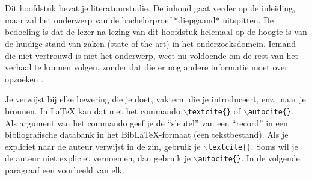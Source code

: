 \chapter{}%
\label{ch:stand-van-zaken}



Dit hoofdstuk bevat je literatuurstudie. De inhoud gaat verder op de inleiding, maar zal het onderwerp van de bachelorproef *diepgaand* uitspitten. De bedoeling is dat de lezer na lezing van dit hoofdstuk helemaal op de hoogte is van de huidige stand van zaken (state-of-the-art) in het onderzoeksdomein. Iemand die niet vertrouwd is met het onderwerp, weet nu voldoende om de rest van het verhaal te kunnen volgen, zonder dat die er nog andere informatie moet over opzoeken \autocite{Pollefliet2011}.

Je verwijst bij elke bewering die je doet, vakterm die je introduceert, enz.\ naar je bronnen. In \LaTeX{} kan dat met het commando \texttt{$\backslash${textcite\{\}}} of \texttt{$\backslash${autocite\{\}}}. Als argument van het commando geef je de ``sleutel'' van een ``record'' in een bibliografische databank in het Bib\LaTeX{}-formaat (een tekstbestand). Als je expliciet naar de auteur verwijst in de zin, gebruik je \texttt{$\backslash${}textcite\{\}}.
Soms wil je de auteur niet expliciet vernoemen, dan gebruik je \texttt{$\backslash${}autocite\{\}}. In de volgende paragraaf een voorbeeld van elk.

